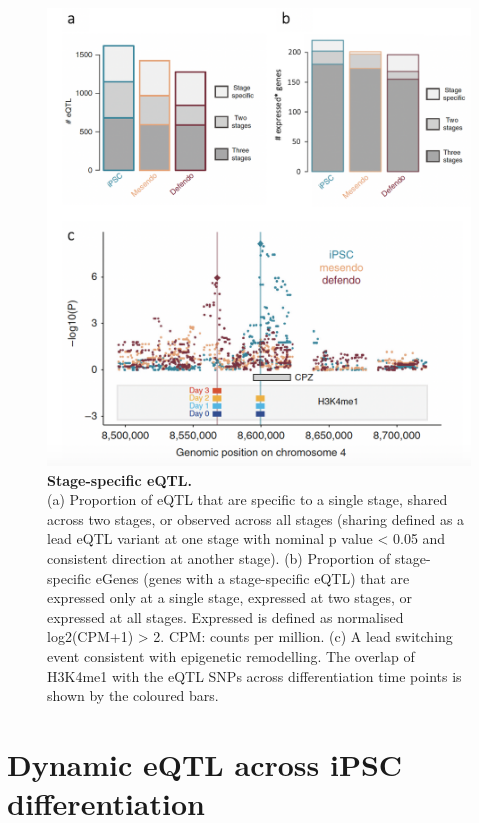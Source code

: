 \begin{figure}[htbp]
\centering
\includegraphics[width=12cm]{Chapter4/Fig/endodiff_stage_specific.png}
\caption[Stage-specific eQTL]{\textbf{Stage-specific eQTL.}\\
(a) Proportion of eQTL that are specific to a single stage, shared across two
stages, or observed across all stages (sharing defined as a lead eQTL variant at one stage with nominal p value < 0.05 and consistent direction
at another stage).
(b) Proportion of stage-specific eGenes (genes with a stage-specific eQTL) that are expressed only at a single stage, expressed at two stages, or expressed at all stages. 
Expressed is defined as normalised log2(CPM+1) > 2. 
CPM: counts per million.
(c) A lead switching event consistent with epigenetic remodelling. 
The overlap of H3K4me1 with the eQTL SNPs across differentiation time points is shown by the coloured bars.}
\label{fig:endodiff_stage_specific_eqtl}
\end{figure}

\newpage

\section{Dynamic eQTL across iPSC differentiation}
\label{sec:endodiff_dynamic_eqtl}

